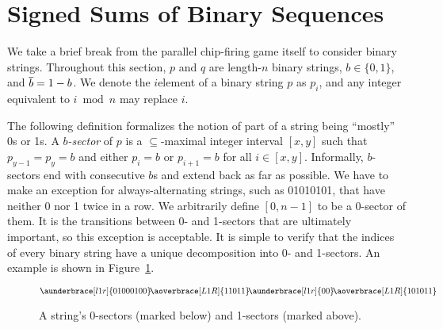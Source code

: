 \section{Signed Sums of Binary Sequences}\label{binSeq}
We take a brief break from the parallel chip-firing game itself to consider
binary strings.  Throughout this section, $p$ and $q$ are length-$n$ binary
strings, $b \in \{0,1\}$, and $\overline{b} = 1-b$. We denote the $i$\xth element of
a binary string $p$ as $p_i$, and any integer equivalent to $i \bmod n$ may
replace $i$.

The following definition formalizes the notion of part of a string being
``mostly'' 0s or 1s. A \emph{$b$-sector} of $p$ is a $\subseteq$-maximal
integer interval $[x,y]$ such that $p_{y-1} = p_y = b$ and either $p_i = b$ or
$p_{i+1} = b$ for all $i \in [x,y]$. Informally, $b$-sectors end with
consecutive $b$s and extend back as far as possible. We have to make an
exception for always-alternating strings, such as 01010101, that have neither 0
nor 1 twice in a row. We arbitrarily define $[0, n-1]$ to be a 0-sector of
them. It is the transitions between 0- and 1-sectors that are ultimately
important, so this exception is acceptable. It is simple to verify that the
indices of every binary string have a unique decomposition into 0- and
1-sectors. An example is shown in Figure~\ref{sectorEx}.

\begin{figure}[tbh]
  \[
    \aunderbrace[l1r]{01000100}
    \!\aoverbrace[L1R]{11011}
    \!\aunderbrace[l1r]{00}
    \!\aoverbrace[L1R]{101011}
  \]
  \caption{A string's 0-sectors (marked below) and 1-sectors (marked
    above).}
  \label{sectorEx}
\end{figure}

